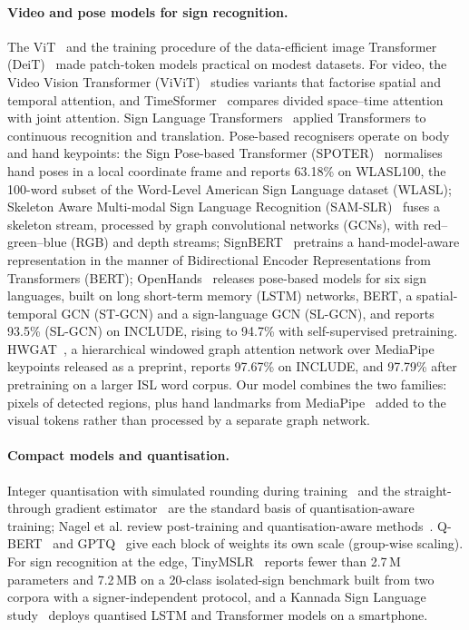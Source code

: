 \documentclass[pdflatex,sn-mathphys-num,twocolumn]{sn-jnl}
\theoremstyle{thmstyleone}%
\begin{document}
\paragraph{Video and pose models for sign recognition.} The ViT~\cite{dosovitskiy2021vit} and the training procedure of the data-efficient image Transformer (DeiT)~\cite{touvron2021deit} made patch-token models practical on modest datasets. For video, the Video Vision Transformer (ViViT)~\cite{arnab2021vivit} studies variants that factorise spatial and temporal attention, and TimeSformer~\cite{bertasius2021timesformer} compares divided space--time attention with joint attention. Sign Language Transformers~\cite{camgoz2020slt} applied Transformers to continuous recognition and translation. Pose-based recognisers operate on body and hand keypoints: the Sign Pose-based Transformer (SPOTER)~\cite{bohacek2022spoter} normalises hand poses in a local coordinate frame and reports 63.18\% on WLASL100, the 100-word subset of the Word-Level American Sign Language dataset (WLASL); Skeleton Aware Multi-modal Sign Language Recognition (SAM-SLR)~\cite{jiang2021samslr} fuses a skeleton stream, processed by graph convolutional networks (GCNs), with red--green--blue (RGB) and depth streams; SignBERT~\cite{hu2021signbert} pretrains a hand-model-aware representation in the manner of Bidirectional Encoder Representations from Transformers (BERT); OpenHands~\cite{selvaraj2022openhands} releases pose-based models for six sign languages, built on long short-term memory (LSTM) networks, BERT, a spatial-temporal GCN (ST-GCN) and a sign-language GCN (SL-GCN), and reports 93.5\% (SL-GCN) on INCLUDE, rising to 94.7\% with self-supervised pretraining. HWGAT~\cite{patra2024hwgat}, a hierarchical windowed graph attention network over MediaPipe keypoints released as a preprint, reports 97.67\% on INCLUDE, and 97.79\% after pretraining on a larger ISL word corpus. Our model combines the two families: pixels of detected regions, plus hand landmarks from MediaPipe~\cite{lugaresi2019mediapipe,zhang2020mphands} added to the visual tokens rather than processed by a separate graph network.

\paragraph{Compact models and quantisation.} Integer quantisation with simulated rounding during training~\cite{jacob2018quant} and the straight-through gradient estimator~\cite{bengio2013ste} are the standard basis of quantisation-aware training; Nagel et al. review post-training and quantisation-aware methods~\cite{nagel2021whitepaper}. Q-BERT~\cite{shen2020qbert} and GPTQ~\cite{frantar2023gptq} give each block of weights its own scale (group-wise scaling). For sign recognition at the edge, TinyMSLR~\cite{lamaakal2026tinymslr} reports fewer than 2.7\,M parameters and 7.2\,MB on a 20-class isolated-sign benchmark built from two corpora with a signer-independent protocol, and a Kannada Sign Language study~\cite{venkatappa2026kannada} deploys quantised LSTM and Transformer models on a smartphone.
\end{document}
